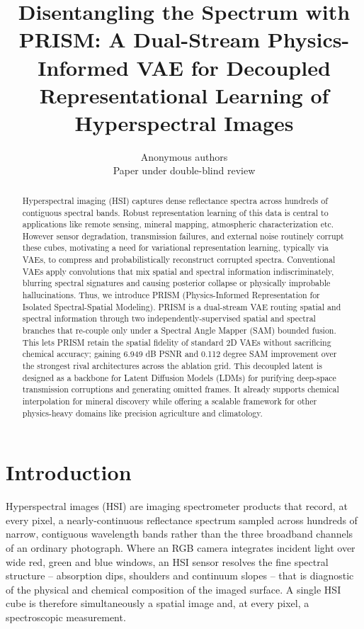 \documentclass{article} %
\title{Disentangling the Spectrum with PRISM: A Dual-Stream Physics-Informed VAE for Decoupled Representational Learning of Hyperspectral Images}
\author{Anonymous authors \\ Paper under double-blind review}
\begin{document}
\maketitle

\begin{abstract}
Hyperspectral imaging (HSI) captures dense reflectance spectra across hundreds of contiguous spectral bands. Robust representation learning of this data is central to applications like remote sensing, mineral mapping, atmospheric characterization etc. However sensor degradation, transmission failures, and external noise routinely corrupt these cubes, motivating a need for variational representation learning, typically via VAEs, to compress and probabilistically reconstruct corrupted spectra. Conventional VAEs apply convolutions that mix spatial and spectral information indiscriminately, blurring spectral signatures and causing posterior collapse or physically improbable hallucinations. Thus, we introduce PRISM (Physics-Informed Representation for Isolated Spectral-Spatial Modeling). PRISM is a dual-stream VAE routing spatial and spectral information through two independently-supervised spatial and spectral branches that re-couple only under a Spectral Angle Mapper (SAM) bounded fusion. This lets PRISM retain the spatial fidelity of standard 2D VAEs without sacrificing chemical accuracy; gaining 6.949 dB PSNR and 0.112 degree SAM improvement over the strongest rival architectures across the ablation grid. This decoupled latent is designed as a backbone for Latent Diffusion Models (LDMs) for purifying deep-space transmission corruptions and generating omitted frames. It already supports chemical interpolation for mineral discovery while offering a scalable framework for other physics-heavy domains like precision agriculture and climatology.
\end{abstract}

\section{Introduction}

Hyperspectral images (HSI) are imaging spectrometer products that record, at every pixel, a nearly-continuous reflectance spectrum sampled across hundreds of narrow, contiguous wavelength bands rather than the three broadband channels of an ordinary photograph. Where an RGB camera integrates incident light over wide red, green and blue windows, an HSI sensor resolves the fine spectral structure -- absorption dips, shoulders and continuum slopes -- that is diagnostic of the physical and chemical composition of the imaged surface. A single HSI cube is therefore simultaneously a spatial image and, at every pixel, a spectroscopic measurement.
\end{document}
